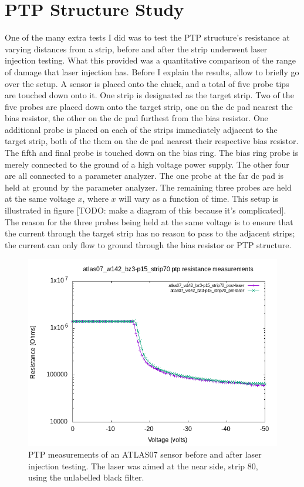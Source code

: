 \documentclass{report}
\begin{document}
        \section{PTP Structure Study} \label{sect:ptp_study}
            One of the many extra tests I did was to test the PTP structure's resistance at varying distances from a strip, before and after the strip underwent laser injection testing. What this provided was a quantitative comparison of the range of damage that laser injection has. Before I explain the results, allow to briefly go over the setup. A sensor is placed onto the chuck, and a total of five probe tips are touched down onto it. One strip is designated as the target strip. Two of the five probes are placed down onto the target strip, one on the dc pad nearest the bias resistor, the other on the dc pad furthest from the bias resistor. One additional probe is placed on each of the strips immediately adjacent to the target strip, both of the them on the dc pad nearest their respective bias resistor. The fifth and final probe is touched down on the bias ring. The bias ring probe is merely connected to the ground of a high voltage power supply. The other four are all connected to a parameter analyzer. The one probe at the far dc pad is held at ground by the parameter analyzer. The remaining three probes are held at the same voltage $x$, where $x$ will vary as a function of time. This setup is illustrated in figure [TODO: make a diagram of this because it's complicated]. The reason for the three probes being held at the same voltage is to ensure that the current through the target strip has no reason to pass to the adjacent strips; the current can only flow to ground through the bias resistor or PTP structure.

            \begin{figure}[h] 
                \includegraphics[height=.4\textheight]{atlas07_w142_bz3-p15_strip70_resistance_plots}
                \centering
                \caption{ PTP measurements of an ATLAS07 sensor before and after laser injection testing. The laser was aimed at the near side, strip 80, using the unlabelled black filter. }
                \label{fig:atlas07_w142_bz3-p15_strip70_resistance_plots}
            \end{figure}
\end{document}
